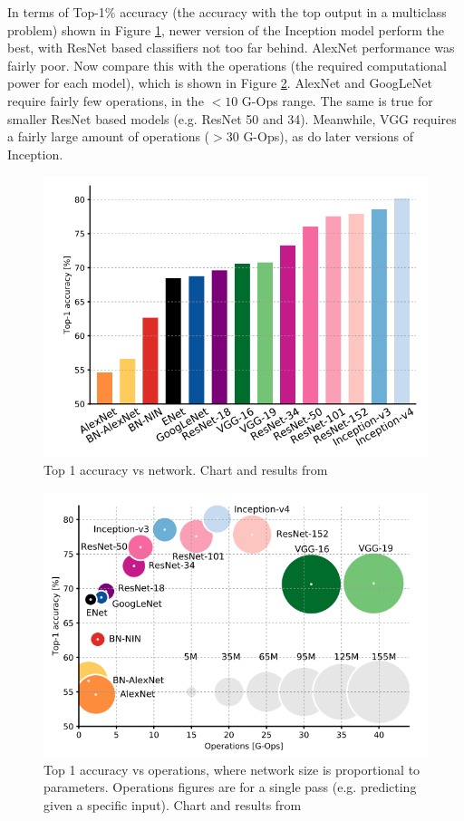 \documentclass[11pt,a4paper]{article}
\begin{document}
        In terms of Top-1\% accuracy (the accuracy with the top output in a multiclass problem) shown in Figure \ref{Top1AccuracyOverNetwork}, newer version of the Inception model perform the best,
        with ResNet based classifiers not too far behind. AlexNet performance was fairly poor. Now compare this with the operations (the required computational power for each model), which is shown in Figure \ref{Top1AccuracyOverOperations}.
        AlexNet and GoogLeNet require fairly few operations, in the $<10$ G-Ops range. The same is true for smaller ResNet based models (e.g. ResNet 50 and 34).
        Meanwhile, VGG requires a fairly large amount of operations ($>30$ G-Ops), as do later versions of Inception.


        \begin{figure}
            \centering
            \includegraphics[width=.7\linewidth]{Top1AccuracyOverNetwork.png}
            \caption{Top 1 accuracy vs network. Chart and results from \cite{DeepNeuralNetworkDeployability}}
            \label{Top1AccuracyOverNetwork}
        \end{figure}

        \begin{figure}
            \centering
            \includegraphics[width=.7\linewidth]{Top1AccuracyOverOperations.png}
            \caption{Top 1 accuracy vs operations, where network size is proportional to parameters. Operations figures are for a single pass (e.g. predicting given a specific input). Chart and results from \cite{DeepNeuralNetworkDeployability}}
            \label{Top1AccuracyOverOperations}
        \end{figure}
\end{document}
